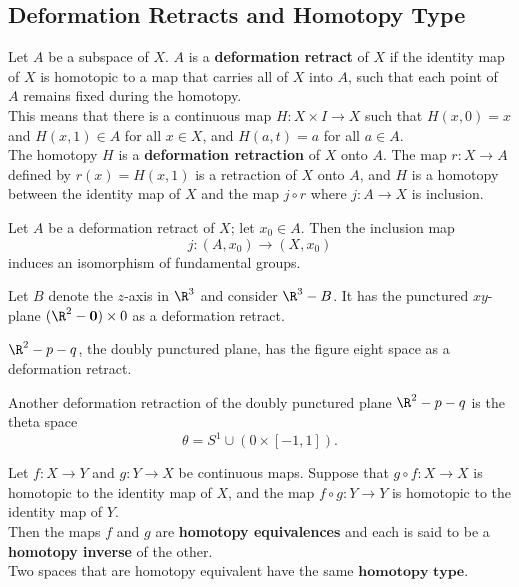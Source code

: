 \subsection{Deformation Retracts and Homotopy Type}
\begin{definition}
Let $A$ be a subspace of $X$. $A$ is a \textbf{deformation retract} of $X$ if the identity map of $X$ is homotopic to a map that carries all of $X$ into $A$, such that each point of $A$ remains fixed during the homotopy. \\

This means that there is a continuous map $H \colon X \times I \rightarrow X$ such that $H(x, 0) = x$ and $H(x, 1) \in A$ for all $x \in X$, and $H(a, t) = a$ for all $a \in A$. \\

The homotopy $H$ is a \textbf{deformation retraction} of $X$ onto $A$. The map $r \colon X \rightarrow A$ defined by $r(x) = H(x, 1)$ is a retraction of $X$ onto $A$, and $H$ is a homotopy between the identity map of $X$ and the map $j \circ r$ where $j \colon A \rightarrow X$ is inclusion.
\end{definition}

\begin{theorem}
Let $A$ be a deformation retract of $X$; let $x_0 \in A$. Then the inclusion map
\[
    j \colon (A, x_0) \rightarrow (X, x_0)
\]
induces an isomorphism of fundamental groups.
\end{theorem}

\begin{eg}
Let $B$ denote the $z$-axis in $\R^3$ and consider $\R^3 - B$. It has the punctured $xy$-plane $(\R^2 - \mathbf{0}) \times 0$ as a deformation retract.
\end{eg}

\begin{eg}
$\R^2 - p - q$, the doubly punctured plane, has the figure eight space as a deformation retract.
\end{eg}

\begin{eg}
Another deformation retraction of the doubly punctured plane $\R^2 - p - q$ is the theta space
\[
    \theta = S^1 \cup (0 \times [-1, 1]).
\]
\end{eg}

\begin{definition}
Let $f \colon X \rightarrow Y$ and $g \colon Y \rightarrow X$ be continuous maps. Suppose that $g \circ f \colon X \rightarrow X$ is homotopic to the identity map of $X$, and the map $f \circ g \colon Y \rightarrow Y$ is homotopic to the identity map of $Y$. \\

Then the maps $f$ and $g$ are \textbf{homotopy equivalences} and each is said to be a \textbf{homotopy inverse} of the other. \\

Two spaces that are homotopy equivalent have the same $\textbf{homotopy type}$.
\end{definition}

